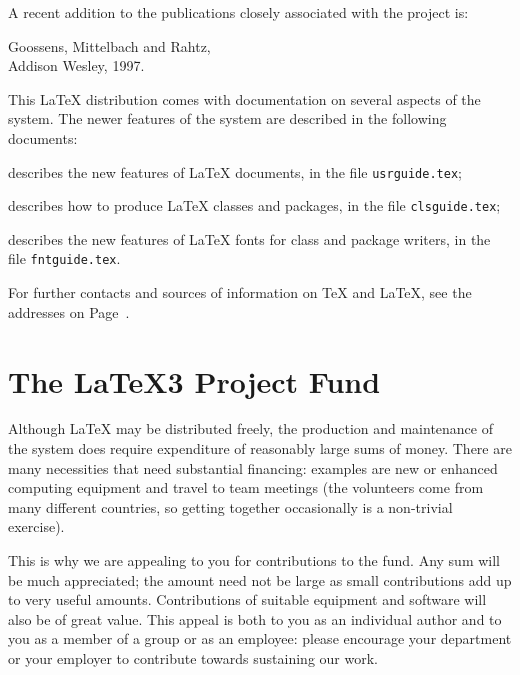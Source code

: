 \documentclass[a4paper]{article}
\newenvironment{citations}{%
   \list{}{%
      \renewcommand{\makelabel}[1]{\normalfont\itshape ##1}%
   }%
}{%
   \endlist
}
\newcommand{\AW}{Addison Wesley}
\begin{document}
A recent addition to the publications closely associated with the
project is:
\begin{citations}
\item[The \LaTeX{} Graphics Companion]
   Goossens, Mittelbach and Rahtz,\\ \AW, 1997.
\end{citations}

This \LaTeX{} distribution comes with documentation on several aspects
of the system.  The newer features of the system are described in
the following documents:
\begin{citations}
\item[\LaTeXe{} for authors]
   describes the new features of \LaTeX{} documents,
   in the file \texttt{usrguide.tex};
\item[\LaTeXe{} for class and package writers]
   describes how to produce \LaTeX{} classes and packages,
   in the file \texttt{clsguide.tex};
\item[\LaTeXe{} font selection]
   describes the new features of \LaTeX{} fonts for
   class and package writers,
   in the file \texttt{fntguide.tex}.
\end{citations}

For further contacts and sources of information on \TeX{} and
\LaTeX{}, see the addresses on Page~\pageref{contacts}.

\endgroup
\pagebreak


\section{The \LaTeX3 Project Fund}
\label{fund}

Although \LaTeX{} may be distributed freely, the production and
maintenance of the system does require expenditure of reasonably large
sums of money.  There are many necessities that need substantial
financing: examples are new or enhanced computing equipment and travel
to team meetings (the volunteers come from many different countries,
so getting together occasionally is a non-trivial exercise).

This is why we are appealing to you for contributions to the fund.
Any sum will be much appreciated; the amount need not be large as
small contributions add up to very useful amounts.  Contributions of
suitable equipment and software will also be of great value.  This
appeal is both to you as an individual author and to you as a member
of a group or as an employee: please encourage your department or your
employer to contribute towards sustaining our work.
\end{document}
